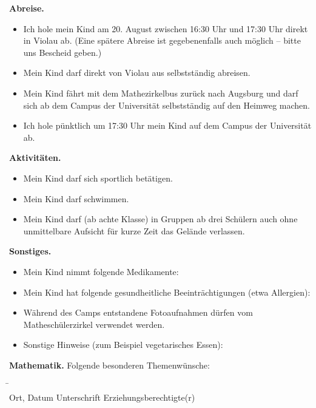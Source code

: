 \documentclass{zettel}
\begin{document}
\begin{shaded}
\textbf{Abreise.}
\begin{itemize}
\item[\checkbox] Ich hole mein Kind am 20. August zwischen 16:30 Uhr und 17:30
Uhr direkt in Violau ab. (Eine spätere Abreise ist gegebenenfalls auch möglich
-- bitte uns Bescheid geben.)
\item[\checkbox] Mein Kind darf direkt von Violau aus selbstständig abreisen.
\item[\checkbox] Mein Kind fährt mit dem Mathezirkelbus zurück nach Augsburg und darf sich
ab dem Campus der Universität selbstständig auf den Heimweg machen.
\item[\checkbox] Ich hole pünktlich um 17:30 Uhr mein Kind auf dem Campus der
Universität ab.
\end{itemize}
\end{shaded}

\begin{shaded}
\textbf{Aktivitäten.}
\begin{itemize}
  \item[\checkbox] Mein Kind darf sich sportlich betätigen.
  \item[\checkbox] Mein Kind darf schwimmen.
  \item[\checkbox] Mein Kind darf (ab achte Klasse) in Gruppen ab drei Schülern
  auch ohne unmittelbare Aufsicht für kurze Zeit das Gelände verlassen.
\end{itemize}
\end{shaded}

\begin{shaded}
\textbf{Sonstiges.}
\begin{itemize}
  \item[\checkbox] Mein Kind nimmt folgende Medikamente: \\[1em] \freistLang
  \item[\checkbox] Mein Kind hat folgende gesundheitliche Beeinträchtigungen
  (etwa Allergien): \\[1em] \freistLang
  \item[\checkbox] Während des Camps entstandene Fotoaufnahmen dürfen
  vom Matheschülerzirkel verwendet werden.
  \item[\checkbox] Sonstige Hinweise (zum Beispiel vegetarisches Essen): \\[1em]
  \freistLang
\end{itemize}
\end{shaded}

\begin{shaded}
\textbf{Mathematik.} Folgende besonderen Themenwünsche:
\freist{5cm}
\end{shaded}

\enlargethispage{0.5cm}

\begin{tabbing}
  \freistMittel \qquad\qquad \= \kill
  \freistMittel \> \freistLaenger \\
  Ort, Datum \> Unterschrift Erziehungsberechtigte(r)
\end{tabbing}
\end{document}
